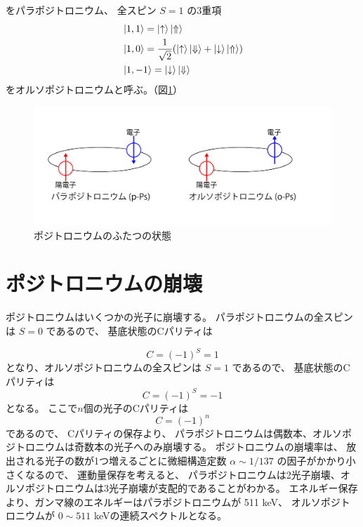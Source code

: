 をパラポジトロニウム、
全スピン $S = 1$ の3重項
\begin{equation}
\begin{split}
&\ket{1,1} = \ket{ \uparrow } \ket{ \Uparrow } \\
&\ket{1,0} = \frac{1}{\sqrt{2}} ( \ket{ \uparrow } \ket{ \Downarrow } + \ket{ \downarrow } \ket{ \Uparrow }) \\
&\ket{1,-1} = \ket{ \downarrow } \ket{ \Downarrow }
\end{split}
\label{eq:ortho}
\end{equation}
をオルソポジトロニウムと呼ぶ。（図\ref{fig:Ps}）

\begin{figure}[H]
\centering
\includegraphics[keepaspectratio, scale=0.4]{fig/ybm/Ps.pdf}
\caption{ポジトロニウムのふたつの状態}
\label{fig:Ps}
\end{figure}


\section{ポジトロニウムの崩壊}

ポジトロニウムはいくつかの光子に崩壊する。
パラポジトロニウムの全スピンは $S=0$ であるので、
基底状態のCパリティは

\begin{equation}
C = (-1)^{S} = 1
\end{equation}
となり、オルソポジトロニウムの全スピンは $S=1$ であるので、
基底状態のCパリティは
\begin{equation}
C = (-1)^{S} = -1
\end{equation}
となる。
ここで$n$個の光子のCパリティは
\begin{equation}
C = (-1)^{n}
\end{equation}
であるので、
Cパリティの保存より、
パラポジトロニウムは偶数本、オルソポジトロニウムは奇数本の光子へのみ崩壊する。
ポジトロニウムの崩壊率は、
放出される光子の数が1つ増えるごとに微細構造定数 $\alpha \sim 1/137$ の因子がかかり小さくなるので、
運動量保存を考えると、
パラポジトロニウムは2光子崩壊、オルソポジトロニウムは3光子崩壊が支配的であることがわかる。
エネルギー保存より、ガンマ線のエネルギーはパラポジトロニウムが 511 keV、
オルソポジトロニウムが $0 \sim 511$  keVの連続スペクトルとなる。


